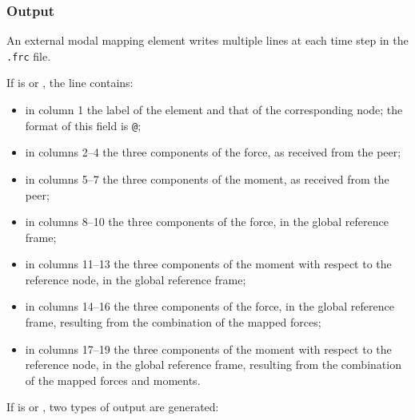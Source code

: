 \subsubsection{Output}
An external modal mapping element writes multiple lines at each time step
in the \texttt{.frc} file.

If  is  or , the line contains:
\begin{itemize}
\item in column 1 the label of the element and that of the corresponding node;
	the format of this field is \texttt{@};
\item in columns 2--4 the three components of the force,
	as received from the peer;
\item in columns 5--7 the three components of the moment,
	as received from the peer;
\item in columns 8--10 the three components of the force,
	in the global reference frame;
\item in columns 11--13 the three components of the moment
	with respect to the reference node,
	in the global reference frame;
\item in columns 14--16 the three components of the force,
	in the global reference frame, resulting from the combination
	of the mapped forces;
\item in columns 17--19 the three components of the moment
	with respect to the reference node,
	in the global reference frame, resulting from the combination
	of the mapped forces and moments.
\end{itemize}
If  is  or , two types of output are generated:
